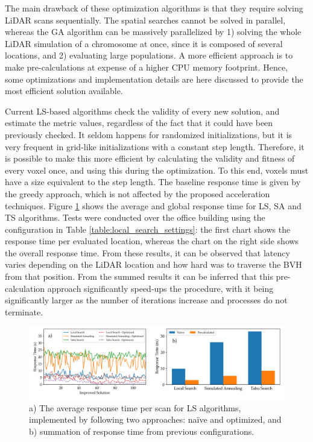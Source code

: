 The main drawback of these optimization algorithms is that they require solving LiDAR scans sequentially. The spatial searches cannot be solved in parallel, whereas the GA algorithm can be massively parallelized by 1) solving the whole LiDAR simulation of a chromosome at once, since it is composed of several locations, and 2) evaluating large populations. A more efficient approach is to make pre-calculations at expense of a higher CPU memory footprint. Hence, some optimizations and implementation details are here discussed to provide the most efficient solution available.

Current LS-based algorithms check the validity of every new solution, and estimate the metric values, regardless of the fact that it could have been previously checked. It seldom happens for randomized initializations, but it is very frequent in grid-like initializations with a constant step length. Therefore, it is possible to make this more efficient by calculating the validity and fitness of every voxel once, and using this during the optimization. To this end, voxels must have a size equivalent to the step length. The baseline response time is given by the greedy approach, which is not affected by the proposed acceleration techniques. Figure \ref{fig:local_search_response_time} shows the average and global response time for LS, SA and TS algorithms. Tests were conducted over the office building using the configuration in Table \ref{table:local_search_settings}: the first chart shows the response time per evaluated location, whereas the chart on the right side shows the overall response time. From these results, it can be observed that latency varies depending on the LiDAR location and how hard was to traverse the BVH from that position. From the summed results it can be inferred that this pre-calculation approach significantly speed-ups the procedure, with it being significantly larger as the number of iterations increase and processes do not terminate.

\begin{figure}
    \centering
    \includegraphics[width=.9\linewidth]{figs/lidar_optimization/response_time_results.png}
	\caption{a) The average response time per scan for LS algorithms, implemented by following two approaches: naïve and optimized, and b) summation of response time from previous configurations.  }
	\label{fig:local_search_response_time}
\end{figure}

